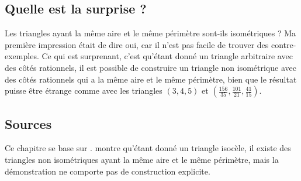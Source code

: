 \subsection*{Quelle est la surprise ?}

Les triangles ayant la même aire et le même périmètre sont-ils isométriques ? Ma première impression était de dire \og oui\fg{}, car il n'est pas facile de trouver des contre-exemples. Ce qui est surprenant, c'est qu'étant donné un triangle arbitraire avec des côtés rationnels, il est possible de construire un triangle non isométrique  avec des côtés rationnels qui a la même aire et le même périmètre, bien que le résultat puisse être étrange comme avec les triangles $(3,4,5)$ et $\left(\frac{156}{35}, \frac{101}{21}, \frac{41}{15}\right)$.



\subsection*{Sources}

Ce chapitre se base sur \cite{mccallum}. \cite{marita} montre qu'étant donné un triangle isocèle, il existe des triangles non isométriques ayant la même aire et le même périmètre, mais la démonstration ne comporte pas de construction explicite.
